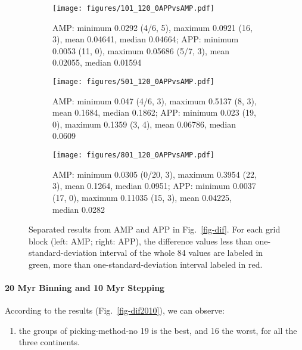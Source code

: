 \begin{figure*}
	\centering
	\begin{subfigure}{1.01\textwidth}
		\texttt{[image: figures/101\_120\_0APPvsAMP.pdf]}
		\caption{AMP: minimum 0.0292 (4/6, 5), maximum 0.0921 (16,
		3), mean 0.04641, median 0.04664; APP: minimum 0.0053 (11, 0), maximum
		0.05686 (5/7, 3), mean 0.02055, median 0.01594}\label{fig-na-difAMPvsAPP}
	\end{subfigure}
	\vspace{.1em}
	\begin{subfigure}{1.01\textwidth}
		\texttt{[image: figures/501\_120\_0APPvsAMP.pdf]}
		\caption{AMP: minimum 0.047 (4/6, 3), maximum 0.5137 (8, 3), mean
		0.1684, median 0.1862; APP: minimum 0.023 (19, 0), maximum 0.1359 (3,
		4), mean 0.06786, median 0.0609}\label{fig-in-difAMPvsAPP}
	\end{subfigure}
	\vspace{.1em}
	\begin{subfigure}{1.01\textwidth}
		\texttt{[image: figures/801\_120\_0APPvsAMP.pdf]}
		\caption{AMP: minimum 0.0305 (0/20, 3), maximum 0.3954 (22,
		3), mean 0.1264, median 0.0951; APP: minimum 0.0037 (17, 0), maximum
		0.11035 (15, 3), mean 0.04225, median 0.0282}\label{fig-au-difAMPvsAPP}
	\end{subfigure}
	\caption[Differences of each plate's paleomagnetic APWPs versus its FHM
predicted APWP (AMP vs APP)]{Separated results from AMP and APP in
Fig.~\ref{fig-dif}. For each grid block (left: AMP; right: APP), the difference
values less than one-standard-deviation interval of the whole 84 values are
labeled in green, more than one-standard-deviation interval labeled in
red.}\label{fig-difAMPvsAPP}
\end{figure*}


\paragraph{20 Myr Binning and 10 Myr Stepping}

According to the results (Fig.~\ref{fig-dif2010}), we can observe:
%
\begin{enumerate}
  \item the groups of picking-method-no 19 is the best, and 16 the worst, for
        all the three continents.
\end{enumerate}

